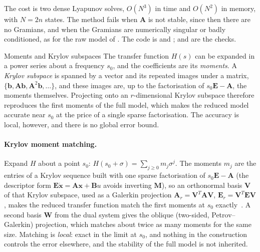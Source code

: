 The cost is two dense Lyapunov solves, $O(N^3)$ in time and $O(N^2)$ in memory, with $N=2n$ states. The method fails when $\bm A$ is not stable, since then there are no Gramians, and when the Gramians are numerically singular or badly conditioned, as for the raw model of . The code is  and ;  and  are the checks.

\begin{sidenote}{Moments and Krylov subspaces}
The transfer function $H(s)$ can be expanded in a power series about a frequency $s_0$, and the coefficients are its \emph{moments}. A \emph{Krylov subspace} is spanned by a vector and its repeated images under a matrix, $\{\bm b,\bm A\bm b,\bm A^2\bm b,\dots\}$, and these images are, up to the factorisation of $s_0\bm E-\bm A$, the moments themselves. Projecting onto an $r$-dimensional Krylov subspace therefore reproduces the first moments of the full model, which makes the reduced model accurate near $s_0$ at the price of a single sparse factorisation. The accuracy is local, however, and there is no global error bound.
\end{sidenote}

\paragraph{Krylov moment matching.}
Expand $H$ about a point $s_0$: $H(s_0+\sigma)=\sum_{j\ge0}m_j\sigma^j$. The moments $m_j$ are the entries of a Krylov sequence built with one sparse factorisation of $s_0\bm E-\bm A$ (the descriptor form $\bm E\dot{\bm x}=\bm A\bm x+\bm B u$ avoids inverting $\bm M$), so an orthonormal basis $\bm V$ of that Krylov subspace, used as a Galerkin projection $\bm A_r=\bm V^T\bm A\bm V$, $\bm E_r=\bm V^T\bm E\bm V$, makes the reduced transfer function match the first moments at $s_0$ exactly~\cite{besselink2013comparison}. A second basis $\bm W$ from the dual system gives the oblique (two-sided, Petrov--Galerkin) projection, which matches about twice as many moments for the same size. Matching is \emph{local}: exact in the limit at $s_0$, and nothing in the construction controls the error elsewhere, and the stability of the full model is not inherited.

